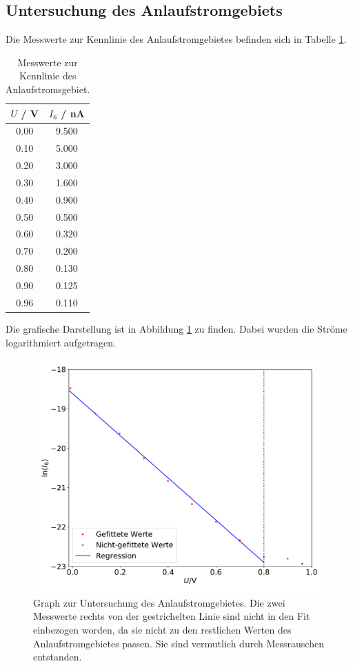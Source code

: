 \subsection{Untersuchung des Anlaufstromgebiets}
\label{sec:c}
Die Messwerte zur Kennlinie des Anlaufstromgebietes befinden sich in Tabelle
\ref{tab:2}.
\begin{table}[h]
  \centering
  \caption{Messwerte zur Kennlinie des Anlaufstromsgebiet.}
  \label{tab:2}
  \begin{tabular}{c c}
    \toprule
    $U$ / \si{\volt} & $I_6$ / \si{\nano\ampere} \\
    \midrule
    0.00 & 9.500 \\
    0.10 & 5.000 \\
    0.20 & 3.000 \\
    0.30 & 1.600 \\
    0.40 & 0.900 \\
    0.50 & 0.500 \\
    0.60 & 0.320 \\
    0.70 & 0.200 \\
    0.80 & 0.130 \\
    0.90 & 0.125 \\
    0.96 & 0.110 \\
    \bottomrule
  \end{tabular}
\end{table}
Die grafische Darstellung ist in Abbildung \ref{fig:3} zu finden. Dabei wurden
die Ströme logarithmiert aufgetragen.
\begin{figure}[h]
  \centering
  \includegraphics[scale=0.3]{anlauf.pdf}
  \caption{Graph zur Untersuchung des Anlaufstromgebietes. Die zwei Messwerte rechts von der
  gestrichelten Linie sind nicht in den Fit einbezogen worden, da sie nicht zu den restlichen Werten
  des Anlaufstromgebietes passen. Sie sind vermutlich durch Messrauschen entstanden.}
  \label{fig:3}
\end{figure}
